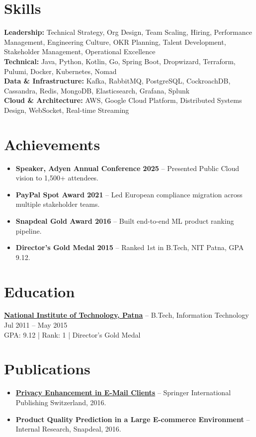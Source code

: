 \documentclass[9pt,a4paper]{article}
\begin{document}
\section{Skills}
\textbf{Leadership:} Technical Strategy, Org Design, Team Scaling, Hiring, Performance Management, Engineering Culture, OKR Planning, Talent Development, Stakeholder Management, Operational Excellence\\[1pt]
\textbf{Technical:} Java, Python, Kotlin, Go, Spring Boot, Dropwizard, Terraform, Pulumi, Docker, Kubernetes, Nomad\\[1pt]
\textbf{Data \& Infrastructure:} Kafka, RabbitMQ, PostgreSQL, CockroachDB, Cassandra, Redis, MongoDB, Elasticsearch, Grafana, Splunk\\[1pt]
\textbf{Cloud \& Architecture:} AWS, Google Cloud Platform, Distributed Systems Design, WebSocket, Real-time Streaming

\section{Achievements}
\begin{itemize}
  \item \textbf{Speaker, Adyen Annual Conference 2025} -- Presented Public Cloud vision to 1,500+ attendees.
  \item \textbf{PayPal Spot Award 2021} -- Led European compliance migration across multiple stakeholder teams.
  \item \textbf{Snapdeal Gold Award 2016} -- Built end-to-end ML product ranking pipeline.
  \item \textbf{Director's Gold Medal 2015} -- Ranked 1st in B.Tech, NIT Patna, GPA 9.12.
\end{itemize}

\section{Education}
\textbf{\href{https://www.nitp.ac.in/}{National Institute of Technology, Patna}} -- B.Tech, Information Technology \hfill Jul 2011 -- May 2015\\
{\small GPA: 9.12 | Rank: 1 | Director's Gold Medal}

\section{Publications}
\begin{itemize}
  \item \href{https://rd.springer.com/chapter/10.1007/978-3-319-32467-8_118}{\textbf{Privacy Enhancement in E-Mail Clients}} -- Springer International Publishing Switzerland, 2016.
  \item \textbf{Product Quality Prediction in a Large E-commerce Environment} -- Internal Research, Snapdeal, 2016.
\end{itemize}
\end{document}
